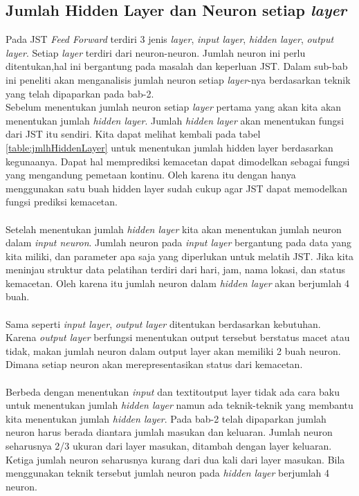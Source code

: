 \subsection{Jumlah Hidden Layer dan Neuron setiap \textit{layer}}
Pada JST \textit{Feed Forward} terdiri 3 jenis \textit{layer}, \textit{input layer}, \textit{hidden layer}, \textit{output layer}. Setiap \textit{layer} terdiri dari neuron-neuron. Jumlah neuron ini perlu ditentukan,hal ini bergantung pada masalah dan keperluan JST. Dalam sub-bab ini peneliti akan menganalisis jumlah neuron setiap \textit{layer}-nya berdasarkan teknik yang telah dipaparkan pada bab-2. \\
Sebelum menentukan jumlah neuron setiap \textit{layer} pertama yang akan kita akan menentukan jumlah \textit{hidden layer}. Jumlah \textit{hidden layer} akan menentukan fungsi dari JST itu sendiri. Kita dapat melihat kembali pada tabel \ref{table:jmlhHiddenLayer} untuk menentukan jumlah hidden layer berdasarkan kegunaanya. Dapat hal memprediksi kemacetan dapat dimodelkan sebagai fungsi yang mengandung pemetaan kontinu. Oleh karena itu dengan hanya menggunakan satu buah hidden layer sudah cukup agar JST dapat memodelkan fungsi prediksi kemacetan.\\\\
Setelah menentukan jumlah \textit{hidden layer} kita akan menentukan jumlah neuron dalam \textit{input neuron}. Jumlah neuron pada \textit{input layer} bergantung pada data yang kita miliki, dan parameter apa saja yang diperlukan untuk melatih JST. Jika kita meninjau struktur data pelatihan terdiri dari hari, jam, nama lokasi, dan status kemacetan. Oleh karena itu jumlah neuron dalam \textit{hidden layer} akan berjumlah 4 buah.\\\\
Sama seperti \textit{input layer}, \textit{output layer} ditentukan berdasarkan kebutuhan. Karena \textit{output layer} berfungsi menentukan output tersebut berstatus macet atau tidak, makan jumlah neuron dalam output layer akan memiliki 2 buah neuron. Dimana setiap neuron akan merepresentasikan status dari kemacetan.\\\\
Berbeda dengan menentukan \textit{input} dan textit{output layer} tidak ada cara baku untuk menentukan jumlah \textit{hidden layer} namun ada teknik-teknik yang membantu kita menentukan jumlah \textit{hidden layer}. Pada bab-2 telah dipaparkan jumlah neuron harus berada diantara jumlah masukan dan keluaran. Jumlah neuron seharusnya 2/3 ukuran dari layer masukan, ditambah dengan layer keluaran. Ketiga jumlah neuron seharusnya kurang dari dua kali dari layer masukan. Bila menggunakan teknik tersebut jumlah neuron pada \textit{hidden layer} berjumlah 4 neuron.
